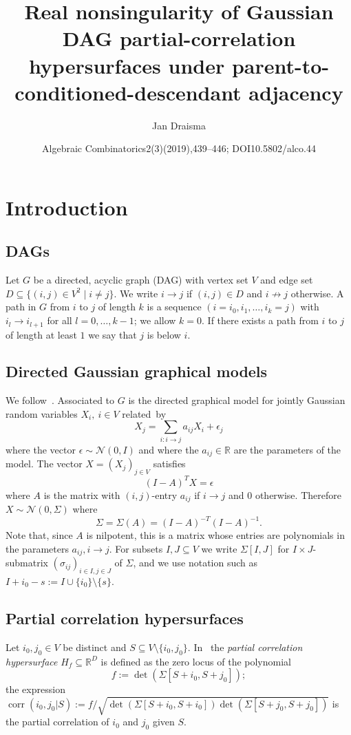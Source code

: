 \documentclass[10pt]{amsart}
\title[Gaussian DAG partial-correlation nonsingularity]{Real nonsingularity of Gaussian DAG partial-correlation hypersurfaces under parent-to-conditioned-descendant adjacency}
\author{Jan Draisma}
\date{Algebraic Combinatorics2(3)(2019),439–446; DOI10.5802/alco.44}
\theoremstyle{definition}
\DeclareMathOperator{\corr}{corr}
\newcommand{\RR}{\mathbb{R}}
\begin{document}
\maketitle
\section{Introduction} \label{sec:Introduction}

\subsection*{DAGs}

Let $G$ be a directed, acyclic graph (DAG) with vertex set $V$ and edge set $D \subseteq \{(i,j) \in V^2 \mid i \neq j\}$. We write $i \to j$ if $(i,j) \in D$ and $i \not \to j$ otherwise. A path in $G$ from $i$ to $j$ of length $k$ is a sequence $(i=i_0,i_1,\ldots,i_k=j)$ with $i_{l} \to i_{l+1}$ for all $l=0,\ldots,k-1$; we allow $k=0$. If there exists a path from $i$ to $j$ of length at least $1$ we say that $j$ is below $i$.

\subsection*{Directed Gaussian graphical models}

We follow~\cite[p.~87]{Drton09}. Associated to $G$ is the directed graphical model for jointly Gaussian random variables $X_i,\ i \in V$ related~by
\[
X_j=\sum_{i: i \to j} a_{ij} X_i + \epsilon_j
\]
where the vector $\epsilon \sim \mathcal{N}(0,I)$ and where the $a_{ij} \in \RR$ are the parameters of the model. The vector $X=(X_j)_{j \in V}$ satisfies
\[
(I-A)^T X=\epsilon
\]
where $A$ is the matrix with $(i,j)$-entry $a_{ij}$ if $i
\to j$ and $0$ otherwise. Therefore $X\sim \mathcal{N}(0,\Sigma)$ where
\[
\Sigma=\Sigma(A)=(I-A)^{-T} (I-A)^{-1}.
\]
Note that, since $A$ is nilpotent, this is a matrix whose entries are polynomials in the parameters $a_{ij}, i \to j$. For subsets $I,J \subseteq V$ we write $\Sigma[I,J]$ for $I \times J$-submatrix $(\sigma_{ij})_{i \in I,j \in J}$ of $\Sigma$, and we use notation such as $I+i_0-s:=I \cup \{i_0\} \setminus \{s\}$.


\subsection*{Partial correlation hypersurfaces}

Let $i_0,j_0 \in V$ be distinct and $S \subseteq V \setminus \{i_0,j_0\}$. In~\cite{Uhler14} the \emph{partial correlation hypersurface} $H_f \subseteq \RR^D$ is defined as the zero locus of the polynomial
\[
f:=\det(\Sigma[S+i_0,S+j_0]);
\]
the expression $\corr(i_0,j_0|S):=f/\sqrt{\det(\Sigma[S+i_0,S+i_0])
\det(\Sigma[S+j_0,S+j_0])}$ is the partial correlation of $i_0$ and $j_0$ given $S$.
\end{document}
